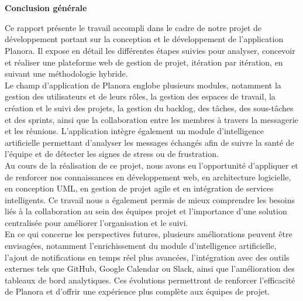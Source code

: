 \chapter*{}
\vspace{-3em}
{\raggedleft\huge\bfseries Conclusion générale\par}
\vspace{2em}
\label{chap:concl}

Ce rapport présente le travail accompli dans le cadre de notre projet de développement portant sur la conception et le développement de l'application Planora. Il expose en détail les différentes étapes suivies pour analyser, concevoir et réaliser une plateforme web de gestion de projet, itération par itération, en suivant une méthodologie hybride.\\
Le champ d'application de Planora englobe plusieurs modules, notamment la gestion des utilisateurs et de leurs rôles, la gestion des espaces de travail, la création et le suivi des projets, la gestion du backlog, des tâches, des sous-tâches et des sprints, ainsi que la collaboration entre les membres à travers la messagerie et les réunions. L'application intègre également un module d'intelligence artificielle permettant d'analyser les messages échangés afin de suivre la santé de l'équipe et de détecter les signes de stress ou de frustration.\\
Au cours de la réalisation de ce projet, nous avons eu l'opportunité d'appliquer et de renforcer nos connaissances en développement web, en architecture logicielle, en conception UML, en gestion de projet agile et en intégration de services intelligents. Ce travail nous a également permis de mieux comprendre les besoins liés à la collaboration au sein des équipes projet et l'importance d'une solution centralisée pour améliorer l'organisation et le suivi.\\
En ce qui concerne les perspectives futures, plusieurs améliorations peuvent être envisagées, notamment l'enrichissement du module d'intelligence artificielle, l'ajout de notifications en temps réel plus avancées, l'intégration avec des outils externes tels que GitHub, Google Calendar ou Slack, ainsi que l'amélioration des tableaux de bord analytiques. Ces évolutions permettront de renforcer l'efficacité de Planora et d'offrir une expérience plus complète aux équipes de projet.